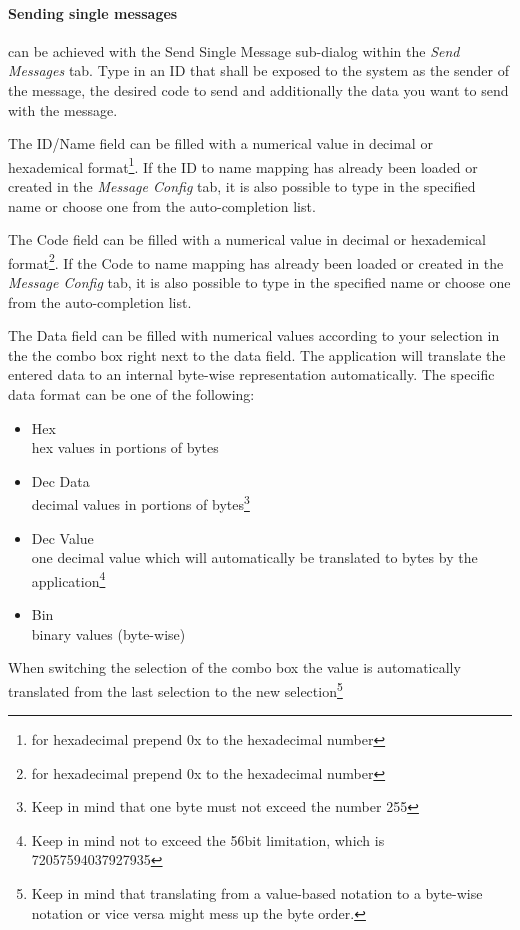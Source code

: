 \documentclass[12pt,a4paper]{scrartcl}
\begin{document}
\paragraph{Sending single messages} can be achieved with the Send Single Message sub-dialog within the \textit{Send Messages} tab. Type in an ID that shall be exposed to the system as the sender of the message, the desired code to send and additionally the data you want to send with the message. 

The ID/Name field can be filled with a numerical value in decimal or hexademical format\footnote{for hexadecimal prepend 0x to the hexadecimal number}. If the ID to name mapping has already been loaded or created in the \textit{Message Config} tab, it is also possible to type in the specified name or choose one from the auto-completion list.

The Code field can be filled with a numerical value in decimal or hexademical format\footnote{for hexadecimal prepend 0x to the hexadecimal number}. If the Code to name mapping has already been loaded or created in the \textit{Message Config} tab, it is also possible to type in the specified name or choose one from the auto-completion list. 

The Data field can be filled with numerical values according to your selection in the the combo box right next to the data field. The application will translate the entered data to an internal byte-wise representation automatically.
The specific data format can be one of the following:

\begin{itemize}
\item Hex\\
hex values in portions of bytes
\item Dec Data\\
decimal values in portions of bytes\footnote{Keep in mind that one byte must not exceed the number 255}
\item Dec Value\\
one decimal value which will automatically be translated to bytes by the application\footnote{Keep in mind not to exceed the 56bit limitation, which is 72057594037927935}
\item Bin\\
binary values (byte-wise)
\end{itemize}

When switching the selection of the combo box the value is automatically translated from the last selection to the new selection\footnote{Keep in mind that translating from a value-based notation to a byte-wise notation or vice versa might mess up the byte order.}
\end{document}
